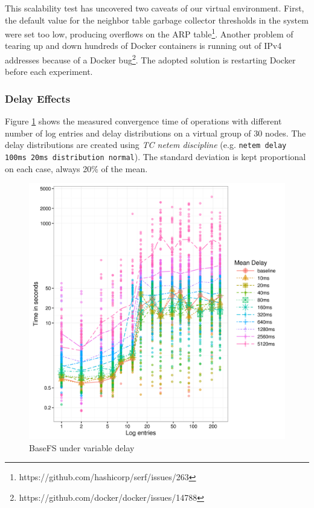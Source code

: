 \documentclass{sig-alternate}
\begin{document}
This scalability test has uncovered two caveats of our virtual environment. First, the default value for the neighbor table garbage collector thresholds in the system were set too low, producing overflows on the ARP table\footnote{https://github.com/hashicorp/serf/issues/263}. Another problem of tearing up and down hundreds of Docker containers is running out of IPv4 addresses because of a Docker bug\footnote{https://github.com/docker/docker/issues/14788}. The adopted solution is restarting Docker before each experiment. 


\subsubsection{Delay Effects}

Figure \ref{fig:basefs-delay} shows the measured convergence time of operations with different number of log entries and delay distributions on a virtual group of 30 nodes. The delay distributions are created using \textit{TC netem discipline} (e.g. \texttt{netem delay 100ms 20ms distribution normal}). The standard deviation is kept proportional on each case, always 20\% of the mean.

\begin{figure}
\centering
\includegraphics[width=\columnwidth]{imgs/basefs-delay.png}
\caption{BaseFS under variable delay}
\label{fig:basefs-delay}
\end{figure}
\end{document}
